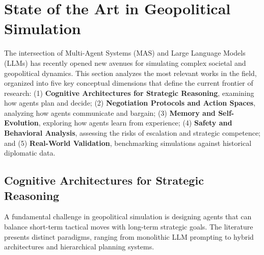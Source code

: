 \chapter{State of the Art in Geopolitical Simulation}
\label{sec:state_of_the_art}

The intersection of Multi-Agent Systems (MAS) and Large Language Models (LLMs) has recently opened new avenues for simulating complex societal and geopolitical dynamics. This section analyzes the most relevant works in the field, organized into five key conceptual dimensions that define the current frontier of research: (1) \textbf{Cognitive Architectures for Strategic Reasoning}, examining how agents plan and decide; (2) \textbf{Negotiation Protocols and Action Spaces}, analyzing how agents communicate and bargain; (3) \textbf{Memory and Self-Evolution}, exploring how agents learn from experience; (4) \textbf{Safety and Behavioral Analysis}, assessing the risks of escalation and strategic competence; and (5) \textbf{Real-World Validation}, benchmarking simulations against historical diplomatic data.

\section{Cognitive Architectures for Strategic Reasoning}
\label{sec:reasoning_architectures}

A fundamental challenge in geopolitical simulation is designing agents that can balance short-term tactical moves with long-term strategic goals. The literature presents distinct paradigms, ranging from monolithic LLM prompting to hybrid architectures and hierarchical planning systems.

